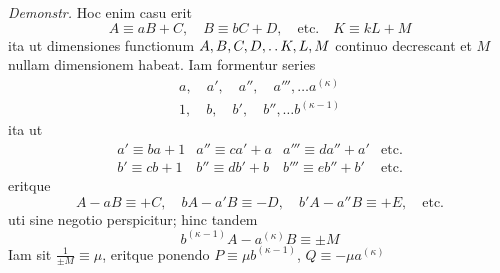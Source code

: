 \emph{Demonstr.} Hoc enim casu erit
\[
A\equiv aB+C,\quad B\equiv bC+D,\quad\text{etc.}\quad K\equiv kL+M
\]
ita ut dimensiones functionum $A,B,C,D,\mathinner{.\,.} K,L,M$ continuo decrescant et $M$ nullam dimensionem habeat. Iam formentur series
\[
\begin{gathered}
a,\quad a',\quad a'',\quad a''',\ldots a^{(\kappa)}\\
1,\quad b,\quad b',\quad b'',\ldots b^{(\kappa-1)}
\end{gathered}
\]
ita ut
\[
\begin{array}{llll}
a'\equiv ba+1&a''\equiv ca'+a&a'''\equiv da''+a'&\text{etc.}\\
b'\equiv cb+1&b''\equiv db'+b&b'''\equiv eb''+b'&\text{etc.}
\end{array}
\]
eritque
\[
A-aB\equiv+C,\quad bA-a'B\equiv-D,\quad b'A-a''B\equiv+E,\quad\text{etc.}
\]
uti sine negotio perspicitur; hinc tandem
\[
b^{(\kappa-1)}A-a^{(\kappa)}B\equiv\pm M
\]
Iam sit $\frac1{\pm M}\equiv\mu$, eritque ponendo $P\equiv\mu b^{(\kappa-1)}$, $Q\equiv-\mu a^{(\kappa)}$
